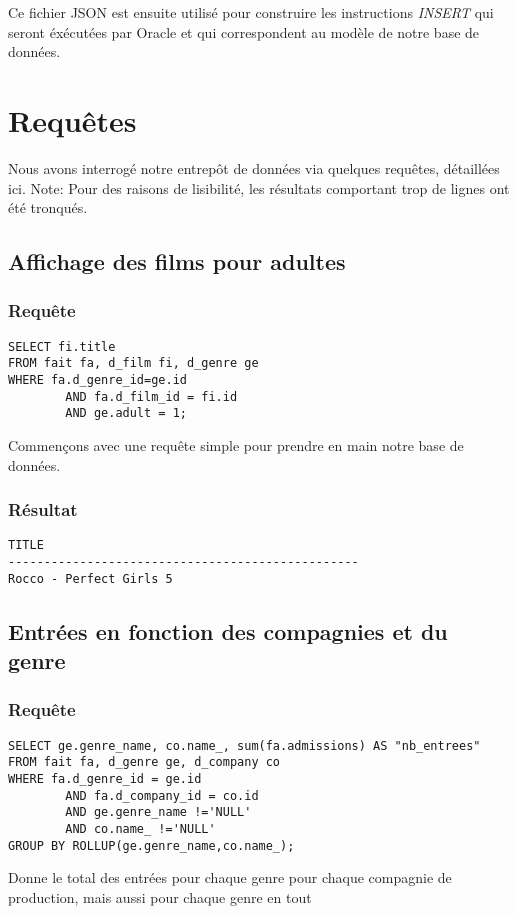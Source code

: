Ce fichier JSON est ensuite utilisé pour construire les instructions \emph{INSERT} qui seront éxécutées par Oracle et qui correspondent au modèle de notre base de données.

\section{Requêtes}

Nous avons interrogé notre entrepôt de données via quelques requêtes, détaillées ici.
Note: Pour des raisons de lisibilité, les résultats comportant trop de lignes ont été tronqués.

\subsection{Affichage des films pour adultes}
\subsubsection{Requête}
\begin{lstlisting}
SELECT fi.title
FROM fait fa, d_film fi, d_genre ge
WHERE fa.d_genre_id=ge.id
		AND fa.d_film_id = fi.id
		AND ge.adult = 1;
\end{lstlisting}
Commençons avec une requête simple pour prendre en main notre base de données.
\subsubsection{Résultat}
\begin{lstlisting}
TITLE
-------------------------------------------------
Rocco - Perfect Girls 5
\end{lstlisting}

\subsection{Entrées en fonction des compagnies et du genre}
\subsubsection{Requête}
\begin{lstlisting}
SELECT ge.genre_name, co.name_, sum(fa.admissions) AS "nb_entrees"
FROM fait fa, d_genre ge, d_company co
WHERE fa.d_genre_id = ge.id
		AND fa.d_company_id = co.id
		AND ge.genre_name !='NULL'
		AND co.name_ !='NULL'
GROUP BY ROLLUP(ge.genre_name,co.name_);
\end{lstlisting}
Donne le total des entrées pour chaque genre pour chaque compagnie de production, mais aussi pour chaque genre en tout
